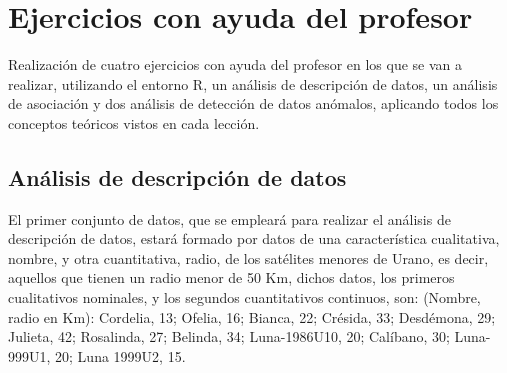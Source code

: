 \documentclass[a4paper, 12pt]{article}
\begin{document}
\section{Ejercicios con ayuda del profesor}
    Realización de cuatro ejercicios con ayuda del profesor en los que se van a realizar, utilizando el entorno R, un análisis de descripción de datos, un análisis de asociación y dos análisis de detección de datos anómalos, aplicando todos los conceptos teóricos vistos en cada lección.
    
    \subsection{Análisis de descripción de datos}
        El primer conjunto de datos, que se empleará para realizar el análisis de descripción de datos, estará formado por datos de una característica cualitativa, nombre, y otra cuantitativa, radio, de los satélites menores de Urano, es decir, aquellos que tienen un radio menor de 50 Km, dichos datos, los primeros cualitativos nominales, y los segundos cuantitativos continuos, son: (Nombre, radio en Km): Cordelia, 13; Ofelia, 16; Bianca, 22; Crésida, 33; Desdémona, 29; Julieta, 42; Rosalinda, 27; Belinda, 34; Luna-1986U10, 20; Calíbano, 30; Luna-999U1, 20; Luna 1999U2, 15.
\end{document}
